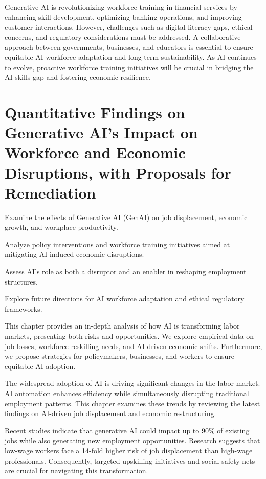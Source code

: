 \documentclass[a4paper,headinclude=on,footinclude=on,12pt,oneside]{scrbook}
\begin{document}

Generative AI is revolutionizing workforce training in financial services by enhancing skill development, optimizing banking operations, and improving customer interactions. However, challenges such as digital literacy gaps, ethical concerns, and regulatory considerations must be addressed. A collaborative approach between governments, businesses, and educators is essential to ensure equitable AI workforce adaptation and long-term sustainability. As AI continues to evolve, proactive workforce training initiatives will be crucial in bridging the AI skills gap and fostering economic resilience.


\chapter{Quantitative Findings on Generative AI’s Impact on Workforce and Economic Disruptions, with Proposals for Remediation}

\begin{arrows}
	\item Examine the effects of Generative AI (GenAI) on job displacement, economic growth, and workplace productivity.
	\item Analyze policy interventions and workforce training initiatives aimed at mitigating AI-induced economic disruptions.
	\item Assess AI’s role as both a disruptor and an enabler in reshaping employment structures.
	\item Explore future directions for AI workforce adaptation and ethical regulatory frameworks.
\end{arrows}

This chapter provides an in-depth analysis of how AI is transforming labor markets, presenting both risks and opportunities. We explore empirical data on job losses, workforce reskilling needs, and AI-driven economic shifts. Furthermore, we propose strategies for policymakers, businesses, and workers to ensure equitable AI adoption.


The widespread adoption of AI is driving significant changes in the labor market. AI automation enhances efficiency while simultaneously disrupting traditional employment patterns. This chapter examines these trends by reviewing the latest findings on AI-driven job displacement and economic restructuring.

Recent studies indicate that generative AI could impact up to 90\% of existing jobs while also generating new employment opportunities. Research suggests that low-wage workers face a 14-fold higher risk of job displacement than high-wage professionals. Consequently, targeted upskilling initiatives and social safety nets are crucial for navigating this transformation.
\end{document}
